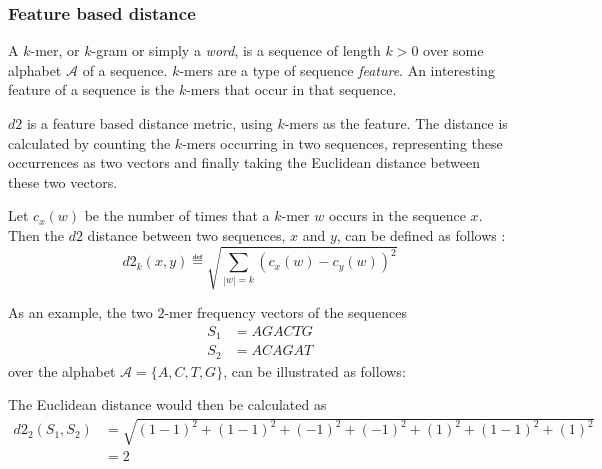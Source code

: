 \subsubsection{Feature based distance}
A $k$-mer, or $k$-gram or simply a \emph{word}, is a sequence of length
$k > 0$ over some alphabet $\mathcal{A}$ of a sequence. $k$-mers are a type
of sequence \emph{feature}. An interesting feature of a sequence is the
$k$-mers that occur in that sequence.

$d2$ is a feature based distance metric, using $k$-mers as the feature. The
distance is calculated by counting the $k$-mers occurring in two sequences,
representing these occurrences as two vectors and finally taking the Euclidean
distance between these two vectors. \cite[pp.~53-54]{dong}

Let $c_x(w)$ be the number of times that a $k$-mer $w$ occurs in the sequence
$x$. Then the $d2$ distance between two sequences, $x$ and $y$, can be defined
as follows \cite[pp.~1-2]{hazelhurst}:
\begin{equation}
  d2_k(x,y) \eqdef \sqrt{\sum_{|w|=k} (c_x(w) - c_y(w))^2}
\end{equation}

As an example, the two $2$-mer frequency vectors of the sequences
\begin{align*}
  S_1 &= AGACTG \\
  S_2 &= ACAGAT
\end{align*}
over the alphabet $\mathcal{A} = \{A,C,T,G\}$, can be illustrated as follows:

\begin{table}[!h]
\centering
{}
\end{table}

The Euclidean distance would then be calculated as
\begin{align*}
  d2_2(S_1, S_2)
    &= \sqrt{(1-1)^2 + (1-1)^2 + (-1)^2 + (-1)^2 + (1)^2 + (1-1)^2 + (1)^2} \\
    &= 2
\end{align*}

